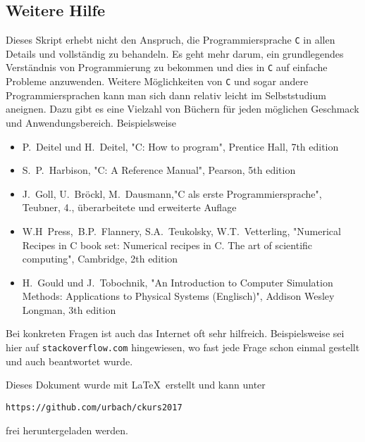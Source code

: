 \subsection{Weitere Hilfe}

Dieses Skript erhebt nicht den Anspruch, die Programmiersprache \texttt{C} in allen Details und vollständig zu behandeln.
Es geht mehr darum, ein grundlegendes Verständnis von Programmierung zu bekommen und dies in \texttt{C} auf einfache Probleme anzuwenden.
Weitere Möglichkeiten von \texttt{C} und sogar andere Programmiersprachen kann man sich dann relativ leicht im Selbststudium aneignen.
Dazu gibt es eine Vielzahl von Büchern für jeden möglichen Geschmack und Anwendungsbereich.
Beispielsweise
\begin{itemize}
\item P.~Deitel und H.~Deitel, "C: How to program", Prentice Hall, 7th edition
\item S.~P.~Harbison, "C: A Reference Manual", Pearson, 5th edition
\item J.~Goll, U.~Bröckl, M.~Dausmann,"C als erste Programmiersprache", Teubner, 4., überarbeitete und erweiterte Auflage
\item W.H~Press,~B.P.~Flannery, S.A.~Teukolsky, W.T.~Vetterling, "Numerical Recipes in C book set: Numerical recipes in C. The art of scientific computing", Cambridge, 2th edition
\item H.~Gould und J.~Tobochnik, "{}An Introduction to Computer Simulation Methods: Applications to Physical Systems (Englisch)", Addison Wesley Longman, 3th edition
\end{itemize}
Bei konkreten Fragen ist auch das Internet oft sehr hilfreich.
Beispielsweise sei hier auf \texttt{stackoverflow.com} hingewiesen, wo fast jede Frage schon einmal gestellt und auch beantwortet wurde.

Dieses Dokument wurde mit \LaTeX\ erstellt und kann unter 
\begin{center}
  \texttt{https://github.com/urbach/ckurs2017} 
\end{center}
frei heruntergeladen werden.
